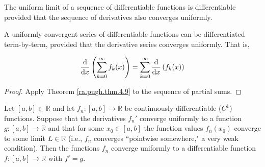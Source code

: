 \begin{theorem}\label{ra.pugh.thm.4.9}

The uniform limit of a sequence of differentiable functions is differentiable provided that the sequence of derivatives also converges uniformly.

\end{theorem}

\begin{theorem}

A uniformly convergent series of differentiable functions can be differentiated term-by-term, provided that the derivative series converges uniformly. That is, 

\[
\deriv{}{x} \left(  \sum_{k=0}^\infty f_k(x) \right) =   \sum_{k=0}^\infty \deriv{}{x} \left( f_k(x) \right) 
\]


\end{theorem}

\begin{proof}

Apply Theorem \ref{ra.pugh.thm.4.9} to the sequence of partial sums.

\end{proof}

\begin{theorem}

Let \([a,b] \subset \mathbb{R}\) and let \(f_n: [a,b] \to \mathbb{R}\) be continuously differentiable (\(C^1\)) functions. Suppose that the derivatives \(f_n'\) converge uniformly to a function \(g: [a,b] \to \mathbb{R}\) and that for some \(x_0 \in [a,b]\) the function values \(f_n(x_0)\) converge to some limit \(L \in \mathbb{R}\) (i.e., \(f_n\) converges ``pointwise somewhere," a very weak condition). Then the functions \(f_n\) converge uniformly to a differentiable function \(f: [a,b] \to \mathbb{R}\) with \(f'=g\).

\end{theorem}


